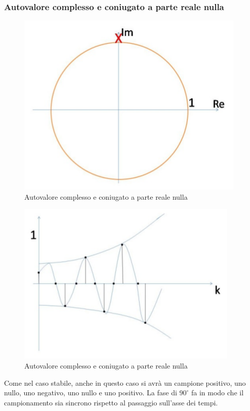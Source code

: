 \documentclass[a4paper]{report}
\begin{document}
\subsubsection{Autovalore complesso e coniugato a parte reale nulla}
\begin{figure}[!h]
  \begin{center}
    \includegraphics[scale=0.3]{./figures/autovaloreComplessoConiugatoRealeNullaInstabile00.png}
    \caption{Autovalore complesso e coniugato a parte reale
      nulla}\label{fig:autovaloreComplessoConiugatoRealeNullaInstabile00.png}
  \end{center}
\end{figure}
\begin{figure}[!h]
  \begin{center}
    \includegraphics[scale=0.3]{./figures/autovaloreComplessoConiugatoRealeNullaInstabile01.png}
    \caption{Autovalore complesso e coniugato a parte reale
      nulla}\label{fig:autovaloreComplessoConiugatoRealeNullaInstabile01.png}
  \end{center}
\end{figure}
Come nel caso stabile, anche in questo caso si avr\`a un campione
positivo, uno nullo, uno negativo, uno nullo e uno positivo. La fase
di $90^{\circ}$ fa in modo che il campionamento sia sincrono rispetto
al passaggio sull'asse dei tempi.
\end{document}
